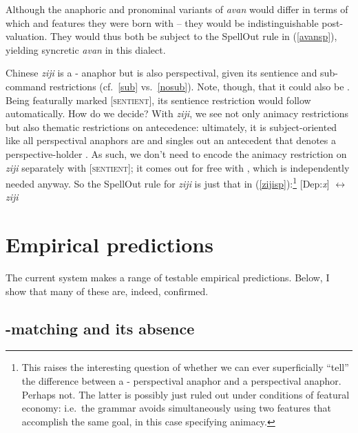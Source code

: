 \documentclass[output=paper, modfonts, nonflat]{langsci/langscibook}
\begin{document}
        \noindent Although the anaphoric and pronominal variants of
        \textit{avan} would differ in terms of which \num{} and
        \gender{} features they were born with -- they would be
        indistinguishable post-valuation. They would thus both be
        subject to the SpellOut rule in (\ref{avansp}), yielding
        syncretic \textit{avan} in this dialect.

        Chinese \textit{ziji} is a \nul-\person{} anaphor but is also
        perspectival, given its sentience and sub-command restrictions
        (cf.\ \ref{sub} vs.\ \ref{nosub}). Note, though, that it
        could also be . Being featurally marked [\textsc{sentient}], its
        sentience restriction would follow automatically. How do we
        decide?  With \textit{ziji}, we see not only animacy
        restrictions but also thematic restrictions on antecedence:
        ultimately, it is subject-oriented like all perspectival
        anaphors are and singles out an antecedent that denotes a
        perspective-holder \citep{huangliu:2001}.  As such, we don't
        need to encode the animacy restriction on \textit{ziji}
        separately with [\textsc{sentient}]; it comes out for free
        with \dep, which is independently needed anyway. So the
        SpellOut rule for \textit{ziji} is just that in
        (\ref{zijisp}):\footnote{This raises the interesting question
          of whether we can ever superficially ``tell'' the difference
          between a \nul-\person{} perspectival anaphor and a 
          perspectival anaphor. Perhaps not.  The latter is possibly
          just ruled out under conditions of featural economy: i.e.\
          the grammar avoids simultaneously using two features that
          accomplish the same goal, in this case specifying animacy.}
        \ea\label{zijisp} {[}Dep:\textit{x}] $\leftrightarrow$
        \textit{ziji} \z


\section{Empirical predictions}
    \label{secpred}

    The current system makes a range of testable empirical
    predictions. Below, I show that many of these are, indeed,
    confirmed.

\subsection{\texorpdfstring{\ph}{\textphi}-matching and its absence}
  \label{phiabs}
\end{document}
